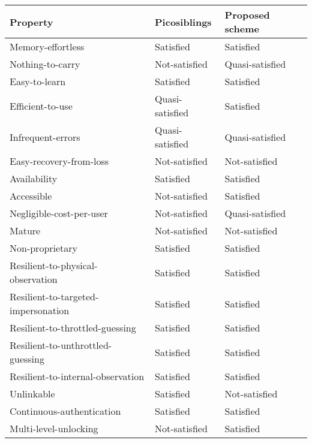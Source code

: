 \begin{table}
    \begin{tabular}{l|l|l}
    Property                            & Picosiblings    & Proposed scheme \\ \hline
    Memory-effortless                   & Satisfied       & Satisfied       \\
    Nothing-to-carry                    & Not-satisfied   & \cellcolor{green!25} Quasi-satisfied \\
    Easy-to-learn                       & Satisfied   	  & Satisfied       \\
    Efficient-to-use                    & Quasi-satisfied & \cellcolor{green!25} Satisfied       \\
    Infrequent-errors                   & Quasi-satisfied & Quasi-satisfied \\
    Easy-recovery-from-loss             & Not-satisfied   & Not-satisfied   \\
    Availability                        & Satisfied       & Satisfied       \\ \hline
    Accessible                          & Not-satisfied   & \cellcolor{green!25} Satisfied       \\
    Negligible-cost-per-user            & Not-satisfied   & \cellcolor{green!25} Quasi-satisfied \\
    Mature                              & Not-satisfied   & Not-satisfied   \\
    Non-proprietary                     & Satisfied       & Satisfied       \\ \hline
    Resilient-to-physical-observation   & Satisfied       & Satisfied       \\
    Resilient-to-targeted-impersonation & Satisfied       & Satisfied       \\
    Resilient-to-throttled-guessing     & Satisfied       & Satisfied       \\
    Resilient-to-unthrottled-guessing   & Satisfied       & Satisfied       \\
    Resilient-to-internal-observation   & Satisfied       & Satisfied       \\
    Unlinkable                          & Satisfied       & \cellcolor{red!25} Not-satisfied   \\
    Continuous-authentication           & Satisfied       & Satisfied       \\
    Multi-level-unlocking               & Not-satisfied   & \cellcolor{green!25} Satisfied       \\
    \end{tabular}
\end{table}

